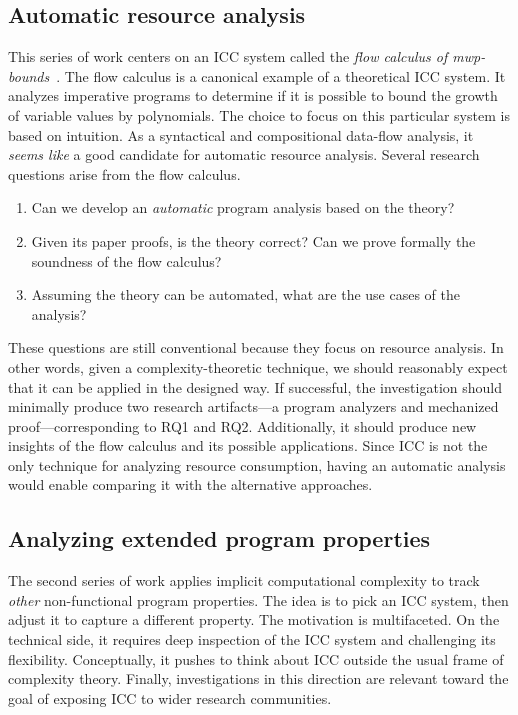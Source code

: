 \subsection{Automatic resource analysis}
\label{subsec:aicc-automatic-resource-analysis}

This series of work centers on an ICC system called the \emph{flow calculus of mwp-bounds}~\cite{jones2009}.
The flow calculus is a canonical example of a theoretical ICC system.
It analyzes imperative programs to determine if it is possible to bound the growth of variable values by polynomials.
The choice to focus on this particular system is based on intuition.
As a syntactical and compositional data-flow analysis, it \emph{seems like} a good candidate for automatic resource analysis.
Several research questions arise from the flow calculus.

\begin{enumerate}[label={(RQ\arabic*)}]
\item Can we develop an \emph{automatic} program analysis based on the theory?
\item Given its paper proofs, is the theory correct?
      Can we prove formally the soundness of the flow calculus?
\item Assuming the theory can be automated, what are the use cases of the analysis?
\end{enumerate}
These questions are still conventional because they focus on resource analysis.
In other words, given a complexity-theoretic technique, we should reasonably expect that it can be applied in the designed way.
If successful, the investigation should minimally produce two research artifacts---a program analyzers and mechanized proof---corresponding to RQ1 and RQ2.
Additionally, it should produce new insights of the flow calculus and its possible applications.
Since ICC is not the only technique for analyzing resource consumption,
having an automatic analysis would enable comparing it with the alternative approaches.

\subsection{Analyzing extended program properties}
\label{subsec:extended-props}

The second series of work applies implicit computational complexity to track \emph{other} non-functional program properties.
The idea is to pick an ICC system, then adjust it to capture a different  property.
The motivation is multifaceted.
On the technical side, it requires deep inspection of the ICC system and challenging its flexibility.
Conceptually, it pushes to think about ICC outside the usual frame of complexity theory.
Finally, investigations in this direction are relevant toward the goal of exposing ICC to wider research communities.

